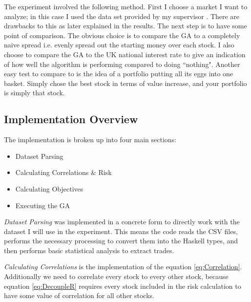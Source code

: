 \documentclass[11pt]{article}
\begin{document}
    The experiment involved the following method. First I choose a market I want to
    analyze; in this case I used the data set provided by my supervisor \cite{Dataset}.
    There are drawbacks to this as later explained in the results. The next step is
    to have some point of comparison. The obvious choice is to compare the GA to
    a completely naive spread i.e. evenly spread out the starting money over each stock.
    I also choose to compare the GA to the UK national interest rate \cite{BankOfE} to give an
    indication of how well the algorithm is performing compared to doing ``nothing". Another
    easy test to compare to is the idea of a portfolio putting all its eggs into one basket.
    Simply chose the best stock in terms of value increase, and your portfolio is simply that
    stock.

\subsection{Implementation Overview}

    The implementation is broken up into four main sections:

    \begin{itemize}
        \item{Dataset Parsing}
        \item{Calculating Correlations \& Risk}
        \item{Calculating Objectives}
        \item{Executing the GA}
    \end{itemize}

    \textit{Dataset Parsing} was implemented in a concrete form to directly work with the
    dataset I will use in the experiment. This means the code reads the CSV files,
    performs the necessary processing to convert them into the Haskell types, and then performs
    basic statistical analysis to extract trades.

    \textit{Calculating Correlations} is the implementation of the equation \ref{eq:Correlation}.
    Additionally we need to correlate every stock to every other stock, because equation
    \ref{eq:DecoupleR} requires every stock included in the risk calculation to have some value of
    correlation for all other stocks.
\end{document}
